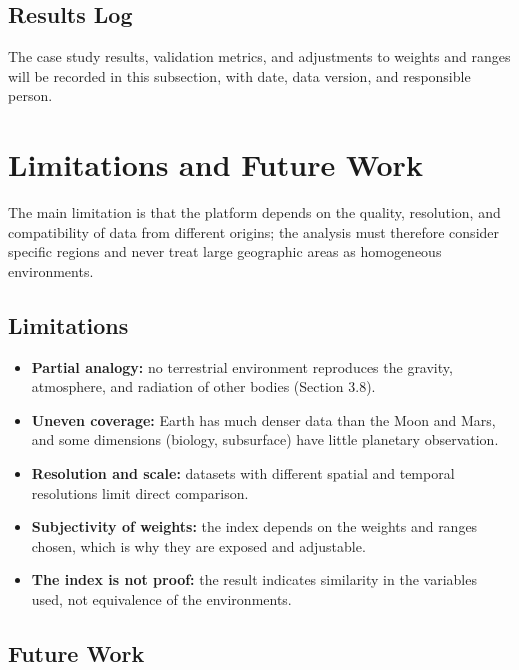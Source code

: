 \documentclass[12pt,letterpaper]{article}
\begin{document}
\subsection{Results Log}

The case study results, validation metrics, and adjustments to weights and ranges will be recorded in this subsection, with date, data version, and responsible person.

\section{Limitations and Future Work}

The main limitation is that the platform depends on the quality, resolution, and compatibility of data from different origins; the analysis must therefore consider specific regions and never treat large geographic areas as homogeneous environments.

\subsection{Limitations}

\begin{itemize}
  \item \textbf{Partial analogy:} no terrestrial environment reproduces the gravity, atmosphere, and radiation of other bodies (Section 3.8).
  \item \textbf{Uneven coverage:} Earth has much denser data than the Moon and Mars, and some dimensions (biology, subsurface) have little planetary observation.
  \item \textbf{Resolution and scale:} datasets with different spatial and temporal resolutions limit direct comparison.
  \item \textbf{Subjectivity of weights:} the index depends on the weights and ranges chosen, which is why they are exposed and adjustable.
  \item \textbf{The index is not proof:} the result indicates similarity in the variables used, not equivalence of the environments.
\end{itemize}

\subsection{Future Work}
\end{document}
